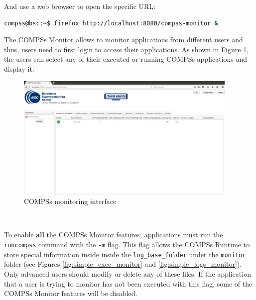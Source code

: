 And use a web browser to open the specific URL:
\begin{lstlisting}[language=bash]
compss@bsc:~$ firefox http://localhost:8080/compss-monitor &
\end{lstlisting}

The COMPSs Monitor allows to monitor applications from different users and thus, users need to first login to access their applications. As shown in Figure \ref{fig:monitoring_interface}, the users can select any of their executed or running COMPSs applications and display it.
\begin{figure}[thb!]
  \centering
    \includegraphics[width=0.95\textwidth]{./Sections/4_Tools/Figures/compss_monitor.jpeg}
    \caption{COMPSs monitoring interface}
    \label{fig:monitoring_interface}
\end{figure}

~ \newline

To enable \textbf{all} the COMPSs Monitor features, applications must run the \texttt{runcompss} command with the \texttt{-m} flag. This flag 
allows the  COMPSs Runtime to store special information inside inside the \texttt{log\_base\_folder} under the \texttt{monitor} 
folder (see Figures \ref{fig:simple_exec_monitor} and \ref{fig:simple_logs_monitor}). Only advanced users should modify or delete any of these files. If the application that a user is trying to monitor 
has not been executed with this flag, some of the COMPSs Monitor features will be disabled. 

